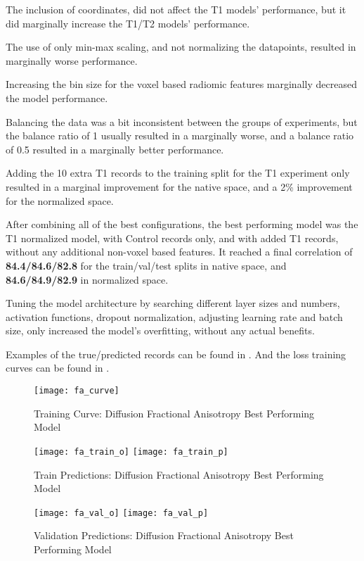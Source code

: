 The inclusion of coordinates, did not affect the T1 models' performance, but it did marginally increase the T1/T2 models' performance.\par
The use of only min-max scaling, and not normalizing the datapoints, resulted in marginally worse performance.\par
Increasing the bin size for the voxel based radiomic features marginally decreased the model performance.\par
Balancing the data was a bit inconsistent between the groups of experiments, but the balance ratio of 1 usually resulted in a marginally worse, and a balance ratio of 0.5 resulted in a marginally better performance.\par
Adding the 10 extra T1 records to the training split for the T1 experiment only resulted in a marginal improvement for the native space, and a 2\% improvement for the normalized space.\par
After combining all of the best configurations, the best performing model was the T1 normalized model, with Control records only, and with added T1 records, without any additional non-voxel based features. It reached a final correlation of \textbf{84.4/84.6/82.8} for the train/val/test splits in native space, and \textbf{84.6/84.9/82.9} in normalized space.\par
Tuning the model architecture by searching different layer sizes and numbers, activation functions, dropout normalization, adjusting learning rate and batch size, only increased the model’s overfitting, without any actual benefits.\par
Examples of the true/predicted records can be found in  . And the loss training curves can be found in .

\begin{figure}[H]
\centering
\texttt{[image: fa\_curve]}
\caption{Training Curve: Diffusion Fractional Anisotropy Best Performing Model}
\label{fig:curve-fa}
\end{figure}

\begin{figure}[H]
\centering
\texttt{[image: fa\_train\_o]}
\texttt{[image: fa\_train\_p]}
\caption{Train Predictions: Diffusion Fractional Anisotropy Best Performing Model}
\label{fig:pred-tra-fa}
\end{figure}

\begin{figure}[H]
\centering
\texttt{[image: fa\_val\_o]}
\texttt{[image: fa\_val\_p]}
\caption{Validation Predictions: Diffusion Fractional Anisotropy Best Performing Model}
\label{fig:pred-val-fa}
\end{figure}

